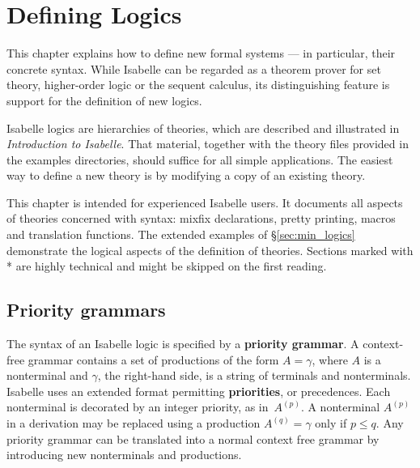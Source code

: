 
\newcommand\rmindex[1]{{#1}\index{#1}\@}
\newcommand\mtt[1]{\mbox{\tt #1}}
\newcommand\ttfct[1]{\mathop{\mtt{#1}}\nolimits}
\newcommand\ttapp{\mathrel{\hbox{\tt\$}}}
\newcommand\Constant{\ttfct{Constant}}
\newcommand\Variable{\ttfct{Variable}}
\newcommand\Appl[1]{\ttfct{Appl}\mathopen{\mtt[}#1\mathclose{\mtt]}}
\newcommand\AST{{\sc ast}}
\let\rew=\longrightarrow


\chapter{Defining Logics} \label{Defining-Logics}

This chapter explains how to define new formal systems --- in particular,
their concrete syntax.  While Isabelle can be regarded as a theorem prover
for set theory, higher-order logic or the sequent calculus, its
distinguishing feature is support for the definition of new logics.

Isabelle logics are hierarchies of theories, which are described and
illustrated in {\em Introduction to Isabelle}.  That material, together
with the theory files provided in the examples directories, should suffice
for all simple applications.  The easiest way to define a new theory is by
modifying a copy of an existing theory.

This chapter is intended for experienced Isabelle users.  It documents all
aspects of theories concerned with syntax: mixfix declarations, pretty
printing, macros and translation functions.  The extended examples of
\S\ref{sec:min_logics} demonstrate the logical aspects of the definition of
theories.  Sections marked with * are highly technical and might be skipped
on the first reading.


\section{Priority grammars} \label{sec:priority_grammars}

The syntax of an Isabelle logic is specified by a {\bf priority grammar}.
A context-free grammar contains a set of
productions of the form $A=\gamma$, where $A$ is a nonterminal and
$\gamma$, the right-hand side, is a string of terminals and nonterminals.
Isabelle uses an extended format permitting {\bf priorities}, or
precedences.  Each nonterminal is decorated by an integer priority, as
in~$A^{(p)}$.  A nonterminal $A^{(p)}$ in a derivation may be replaced
using a production $A^{(q)} = \gamma$ only if $p \le q$.  Any priority
grammar can be translated into a normal context free grammar by introducing
new nonterminals and productions.

